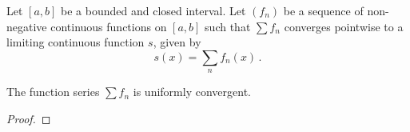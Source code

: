 \documentclass[week=6]{homework}
\begin{document}
\begin{questions}
	    
	    \question
	    
	    \question
	    Let $[a,b]$ be a bounded and closed interval. Let $(f_n)$ be a sequence of non-negative continuous functions on $[a,b]$ such that $\sum f_n$ converges pointwise to a limiting continuous function $s$, given by
	    \[
		    s(x) = \sum_n f_n(x)\,.
	    \]
	    \begin{toprove}
	    	The function series $\sum f_n$ is uniformly convergent.
	    \end{toprove}
	    \begin{proof}
	    \end{proof}
     \end{questions}
\end{document}
